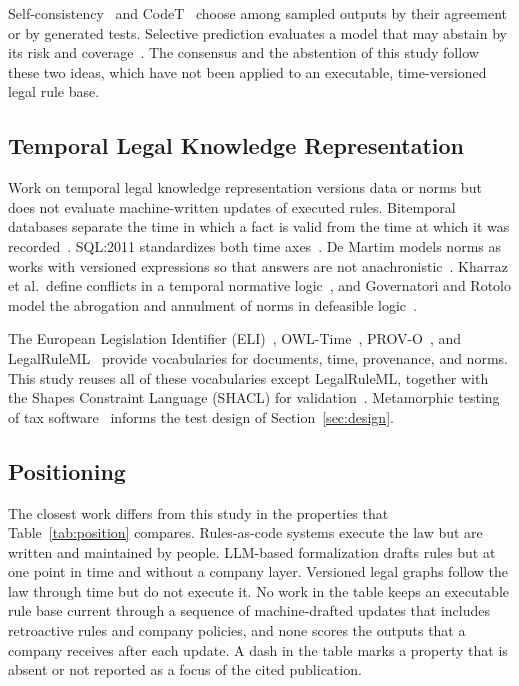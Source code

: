 Self-consistency~\cite{wang2023selfconsistency} and CodeT~\cite{chen2023codet} choose among sampled outputs by their agreement or by generated tests. Selective prediction evaluates a model that may abstain by its risk and coverage~\cite{geifman2017selective,xin2021abstention}. The consensus and the abstention of this study follow these two ideas, which have not been applied to an executable, time-versioned legal rule base.

\subsection{Temporal Legal Knowledge Representation}
Work on temporal legal knowledge representation versions data or norms but does not evaluate machine-written updates of executed rules. Bitemporal databases separate the time in which a fact is valid from the time at which it was recorded~\cite{snodgrass1999developing}. SQL:2011 standardizes both time axes~\cite{kulkarni2012temporal}. De Martim models norms as works with versioned expressions so that answers are not anachronistic~\cite{demartim2025satgraph}. Kharraz et al.\ define conflicts in a temporal normative logic~\cite{kharraz2024conflicts}, and Governatori and Rotolo model the abrogation and annulment of norms in defeasible logic~\cite{governatori2010changing}.

The European Legislation Identifier (ELI)~\cite{publicationsoffice2026elien}, OWL-Time~\cite{cox2017owltime}, PROV-O~\cite{lebo2013provo}, and LegalRuleML~\cite{palmirani2021legalruleml} provide vocabularies for documents, time, provenance, and norms. This study reuses all of these vocabularies except LegalRuleML, together with the Shapes Constraint Language (SHACL) for validation~\cite{knublauch2017shacl}. Metamorphic testing of tax software~\cite{tizpaz2023metamorphic} informs the test design of Section~\ref{sec:design}.

\subsection{Positioning}
The closest work differs from this study in the properties that Table~\ref{tab:position} compares. Rules-as-code systems execute the law but are written and maintained by people. LLM-based formalization drafts rules but at one point in time and without a company layer. Versioned legal graphs follow the law through time but do not execute it. No work in the table keeps an executable rule base current through a sequence of machine-drafted updates that includes retroactive rules and company policies, and none scores the outputs that a company receives after each update. A dash in the table marks a property that is absent or not reported as a focus of the cited publication.

